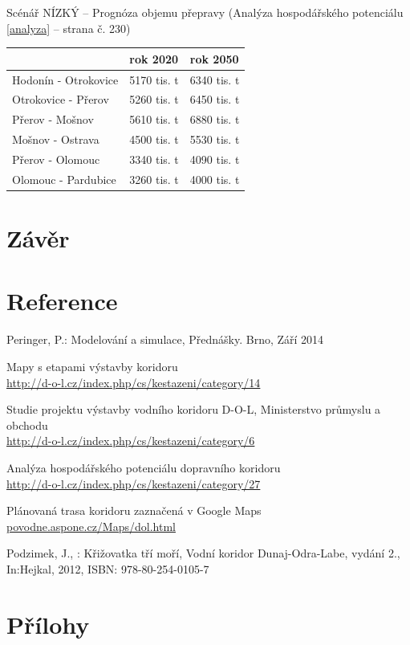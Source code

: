\documentclass[11pt,a4paper]{article}
\begin{document}
    \noindent 
    Scénář NÍZKÝ -- Prognóza objemu přepravy (Analýza hospodářského
    potenciálu \ref{analyza} -- strana č. 230)
    \begin{center}
      \begin{tabular}{| l | l | l |}
        \hline
        & rok 2020 & rok 2050 \\ \hline
        Hodonín - Otrokovice & 5170 tis. t & 6340 tis. t \\ \hline
        Otrokovice - Přerov & 5260 tis. t & 6450 tis. t \\ \hline
        Přerov - Mošnov & 5610 tis. t & 6880 tis. t \\ \hline
        Mošnov - Ostrava & 4500 tis. t & 5530 tis. t \\ \hline
        Přerov - Olomouc & 3340 tis. t & 4090 tis. t \\ \hline
        Olomouc - Pardubice & 3260 tis. t & 4000 tis. t \\ \hline
        \end{tabular}
    \end{center}

  \section{Závěr}

  \section{Reference}

    \begin{enumerate}[label={[\arabic*]}]
      \item Peringer, P.: Modelování a simulace, Přednášky. Brno, Září 2014
        \label{peringer}
      \item Mapy s etapami výstavby koridoru \\
        \href{http://d-o-l.cz/index.php/cs/kestazeni/category/14}
        {http://d-o-l.cz/index.php/cs/kestazeni/category/14} \label{mapa}
      \item Studie projektu výstavby vodního koridoru D-O-L,
            Ministerstvo průmyslu a obchodu \\
        \href{http://d-o-l.cz/index.php/cs/kestazeni/category/6}
             {http://d-o-l.cz/index.php/cs/kestazeni/category/6} \label{studie}
      \item Analýza hospodářského potenciálu dopravního koridoru \\
        \href{http://d-o-l.cz/index.php/cs/kestazeni/category/27}
             {http://d-o-l.cz/index.php/cs/kestazeni/category/27} \label{analyza}
      \item Plánovaná trasa koridoru zaznačená v Google Maps \\
        \href{http://povode.aspone.cz/Maps/dol.html}
             {povodne.aspone.cz/Maps/dol.html} \label{google-mapa}
      \item Podzimek, J., : Křižovatka tří moří, Vodní koridor Dunaj-Odra-Labe,
            vydání 2., In:Hejkal, 2012, ISBN: 978-80-254-0105-7 \label{kniha}
    \end{enumerate}

  \appendix
  \newpage

  \section{Přílohy}

  
\end{document}
